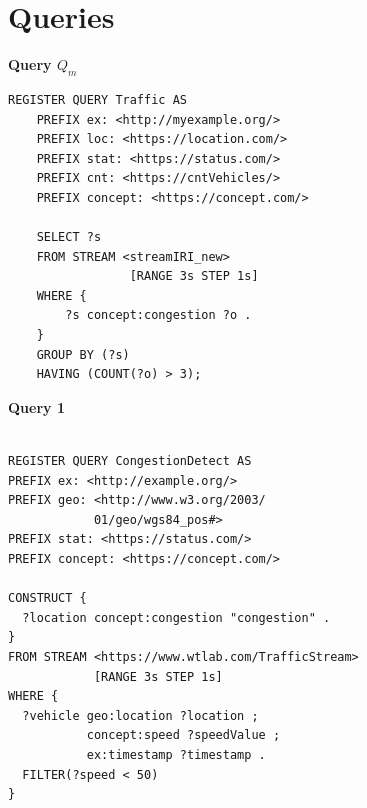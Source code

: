 \documentclass[5p,times]{elsarticle}
\begin{document}




%





\appendix

\section{Queries}
\label{sec:AppendixQueries}


\textbf{Query \(Q_m\)}
\begin{verbatim}
REGISTER QUERY Traffic AS
    PREFIX ex: <http://myexample.org/>
    PREFIX loc: <https://location.com/>
    PREFIX stat: <https://status.com/>
    PREFIX cnt: <https://cntVehicles/>
    PREFIX concept: <https://concept.com/>

    SELECT ?s
    FROM STREAM <streamIRI_new>
                 [RANGE 3s STEP 1s]
    WHERE {
        ?s concept:congestion ?o .
    }
    GROUP BY (?s)
    HAVING (COUNT(?o) > 3);
\end{verbatim}



\textbf{Query 1}

\begin{verbatim}

REGISTER QUERY CongestionDetect AS
PREFIX ex: <http://example.org/>
PREFIX geo: <http://www.w3.org/2003/
            01/geo/wgs84_pos#>
PREFIX stat: <https://status.com/>
PREFIX concept: <https://concept.com/>

CONSTRUCT {
  ?location concept:congestion "congestion" .
}
FROM STREAM <https://www.wtlab.com/TrafficStream>
            [RANGE 3s STEP 1s]
WHERE {
  ?vehicle geo:location ?location ;
           concept:speed ?speedValue ;
           ex:timestamp ?timestamp .
  FILTER(?speed < 50)
}

\end{verbatim}
\end{document}
